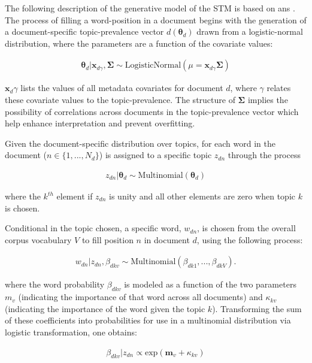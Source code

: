 \documentclass[12pt,a4paper,notitlepage]{article}
\begin{document}
The following description of the generative model of the STM is based on \citet{roberts_structural_2013} ans . The process of filling a word-position in a document begins with the generation of a document-specific topic-prevalence vector $d(\boldsymbol{\theta}_d)$ drawn from a logistic-normal distribution, where the parameters are a function of the covariate values:

\begin{align*}
	\boldsymbol{\theta}_d|\boldsymbol{x}_{d\gamma},\boldsymbol{\Sigma} \sim \textrm{LogisticNormal}(\mu = \boldsymbol{x}_{d\gamma}\boldsymbol{\Sigma})
\end{align*}

$\boldsymbol{x}_d\gamma$ lists the values of all metadata covariates for document $d$, where $\gamma$ relates these covariate values to the topic-prevalence. The structure of $\boldsymbol{\Sigma}$ implies the possibility of correlations across documents in the topic-prevalence vector which help enhance interpretation and prevent overfitting. 

Given the document-specific distribution over topics, for each word in the document ($n \in \lbrace 1,...,N_d\rbrace$) is assigned to a specific topic $z_{dn}$ through the process

\begin{align*}
	z_{dn}|\boldsymbol{\theta}_d \sim \textrm{Multinomial}(\boldsymbol{\theta}_d)
\end{align*}

where the $k^{th}$ element if $z_{dn}$ is unity and all other elements are zero when topic $k$ is chosen. 

Conditional in the topic chosen, a specific word, $w_{dn}$, is chosen from the overall corpus vocabulary $V$ to fill position $n$ in document $d$, using the following process:

\begin{align*}
	w_{dn}|z_{dn},\beta_{dkv} \sim \textrm{Multinomial}(\beta_{dk1},...,\beta_{dkV}).
\end{align*}

where the word probability $\beta_{dkv}$ is modeled as a function of the two parameters $m_v$ (indicating the importance of that word across all documents) and $\kappa_{kv}$ (indicating the importance of the word given the topic $k$). Transforming the sum of these coefficients into probabilities for use in a multinomial distribution via logistic transformation, one obtains:

\begin{align*}
	\beta_{dkv}|z_{dn}\propto\textrm{exp}(\boldsymbol{m}_v+\kappa_{kv})
\end{align*}
\end{document}
